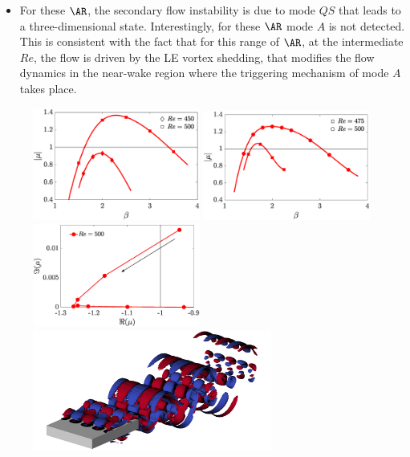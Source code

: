 
\begin{itemize}
  \item For these $\AR$, the secondary flow instability is due to mode $QS$ that leads to a three-dimensional state. Interestingly, for these $\AR$ mode $A$ is not detected. This is consistent with the fact that for this range of $\AR$, at the intermediate $Re$, the flow is driven by the LE vortex shedding, that modifies the flow dynamics in the near-wake region where the triggering mechanism of mode $A$ takes place. 
\end{itemize}

\begin{figure}
  \centering
  \includegraphics[width=0.49\textwidth]{./fig/AR7s/multipliers_AR6.eps}  
  \includegraphics[width=0.49\textwidth]{./fig/AR7s/multipliers_AR7.eps}
  \includegraphics[width=0.49\textwidth]{./fig/AR7s/multipliers_AR7_b.eps}
  \includegraphics[width=0.7\textwidth]{./fig/AR7s/Floqetmode_beta_2p2_Re500_AR7.png}

\end{figure}
